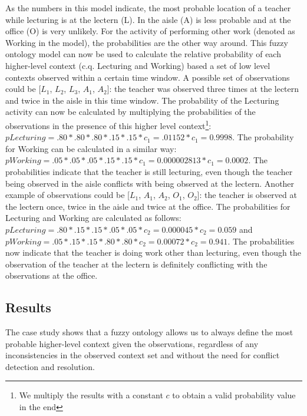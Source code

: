 \documentclass[journal]{vgtc}                %
\begin{document}
As the numbers in this model indicate, the most probable location of a teacher while lecturing is at the lectern (L). In the aisle (A) is less probable and at the office (O) is very unlikely. For the activity of performing other work (denoted as Working in the model), the probabilities are the other way around. This fuzzy ontology model can now be used to calculate the relative probability of each higher-level context (c.q. Lecturing and Working) based a set of low level contexts observed within a certain time window. A possible set of observations could be [$L_1$, $L_2$, $L_3$, $A_1$, $A_2$]: the teacher was observed three times at the lectern and twice in the aisle in this time window. The probability of the Lecturing activity can now be calculated by multiplying the probabilities of the observations in the presence of this higher level context\footnote{We multiply the results with a constant $c$ to obtain a valid probability value in the end}: $pLecturing = .80 * .80 * .80 * .15 * .15 * c_1 = .01152 * c_1 = 0.9998$. The probability for Working can be calculated in a similar way: $pWorking = .05 * .05 * .05 * .15 * .15 * c_1 = 0.000002813 * c_1 = 0.0002$. The probabilities indicate that the teacher is still lecturing, even though the teacher being observed in the aisle conflicts with being observed at the lectern. Another example of observations could be [$L_1$, $A_1$, $A_2$, $O_1$, $O_2$]: the teacher is observed at the lectern once, twice in the aisle and twice at the office. The probabilities for Lecturing and Working are calculated as follows: $pLecturing = .80 * .15 * .15 * .05 * .05 * c_2 = 0.000045 * c_2 = 0.059$ and $pWorking = .05 * .15 * .15 * .80 * .80 * c_2 = 0.00072 * c_2 = 0.941$. The probabilities now indicate that the teacher is doing work other than lecturing, even though the observation of the teacher at the lectern is definitely conflicting with the observations at the office.
\subsection{Results}
The case study shows that a fuzzy ontology allows us to always define the most probable higher-level context given the observations, regardless of any inconsistencies in the observed context set and without the need for conflict detection and resolution.
\end{document}
